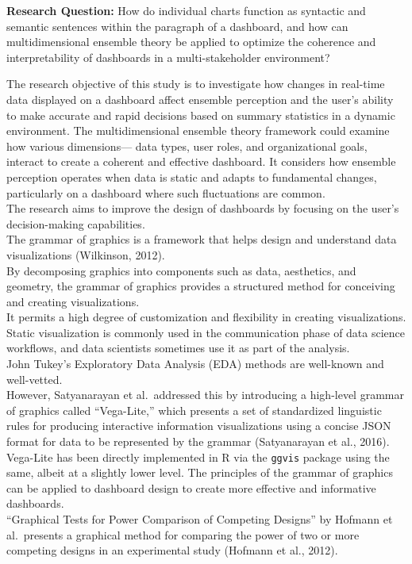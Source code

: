 \documentclass[print]{nuthesis}
\begin{document}
\textbf{Research Question:} How do individual charts function as syntactic and semantic sentences within the paragraph of a dashboard, and how can multidimensional ensemble theory be applied to optimize the coherence and interpretability of dashboards in a multi-stakeholder environment?

The research objective of this study is to investigate how changes in real-time data displayed on a dashboard affect ensemble perception and the user's ability to make accurate and rapid decisions based on summary statistics in a dynamic environment.
The multidimensional ensemble theory framework could examine how various dimensions--- data types, user roles, and organizational goals, interact to create a coherent and effective dashboard.
It considers how ensemble perception operates when data is static and adapts to fundamental changes, particularly on a dashboard where such fluctuations are common.\\
The research aims to improve the design of dashboards by focusing on the user's decision-making capabilities.\\
The grammar of graphics is a framework that helps design and understand data visualizations (Wilkinson, 2012).\\
By decomposing graphics into components such as data, aesthetics, and geometry, the grammar of graphics provides a structured method for conceiving and creating visualizations.\\
It permits a high degree of customization and flexibility in creating visualizations.
Static visualization is commonly used in the communication phase of data science workflows, and data scientists sometimes use it as part of the analysis.\\
John Tukey's Exploratory Data Analysis (EDA) methods are well-known and well-vetted.\\
However, Satyanarayan et al.~addressed this by introducing a high-level grammar of graphics called ``Vega-Lite,'' which presents a set of standardized linguistic rules for producing interactive information visualizations using a concise JSON format for data to be represented by the grammar (Satyanarayan et al., 2016).\\
Vega-Lite has been directly implemented in R via the \texttt{ggvis} package using the same, albeit at a slightly lower level.
The principles of the grammar of graphics can be applied to dashboard design to create more effective and informative dashboards.\\
``Graphical Tests for Power Comparison of Competing Designs'' by Hofmann et al.~presents a graphical method for comparing the power of two or more competing designs in an experimental study (Hofmann et al., 2012).
\end{document}
